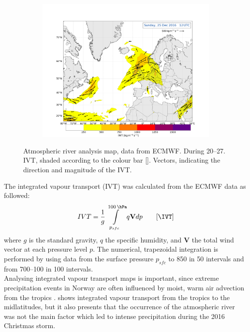 \begin{figure}[H]
\begin{subfigure}[b]{\textwidth}
		\includegraphics[trim={4.2cm 0cm 4.3cm 36.8cm},clip,
		width=\textwidth]{./fig_Atm_Riv/20161225_12}
	\end{subfigure}
\caption{Atmospheric river analysis map, data from ECMWF. During \SIrange{20}{27}{\dec}. IVT, shaded according to the colour bar [\SI{}{\IVT}]. Vectors, indicating the direction and magnitude of the IVT. }\label{fig:AtmRiv}
\end{figure}
\noindent
The integrated vapour transport (IVT) was calculated from the ECMWF data as followed:
\begin{align}
IVT = \frac{1}{g} \int\limits_{p_{sfc}}^{\SI{100}{\hPa}} q \mathbf{V} dp \qquad [\SI{}{\IVT}]
\label{eq:IVT}
\end{align} 
where $g$ is the standard gravity, $q$ the specific humidity, and $\mathbf{V}$ the total wind vector at each pressure level $p$. The numerical, trapezoidal integration is performed by using data from the surface pressure $p_{sfc}$ to \SI{850}{\hPa} in \SI{50}{\hPa} intervals and from \SIrange{700}{100}{\hPa} in \SI{100}{\hPa} intervals.
\\
Analysing integrated vapour transport maps is important, since extreme precipitation events in Norway are often influenced by moist, warm air advection from the tropics \citep{azad_extreme_2017}.  shows integrated vapour transport from the tropics to the midlatitudes, but it also presents that the occurrence of the atmospheric river was not the main factor which led to intense precipitation during the 2016 Christmas storm. 
